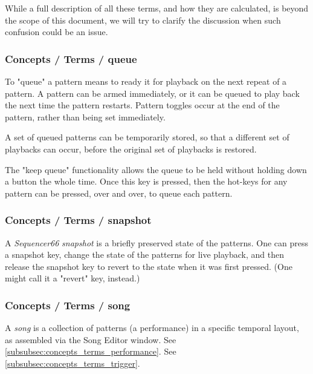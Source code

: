    While a full description of all these terms, and how they are calculated, is
   beyond the scope of this document, we will try to clarify the discussion
   when such confusion could be an issue.

\subsubsection{Concepts / Terms / queue}
\label{subsubsec:concepts_terms_queue_mode}

   To "queue" a pattern means to ready it for playback on the next repeat of
   a pattern.  A pattern can be armed immediately, or it can be queued to
   play back the next time the pattern restarts.
   Pattern toggles occur at the end of
   the pattern, rather than being set immediately.

   A set of queued patterns can be temporarily stored, so that a different
   set of playbacks can occur, before the original set of playbacks is
   restored.

   The "keep queue" functionality allows the queue to be held without
   holding down a button the whole time.  Once this key is pressed,
   then the hot-keys for any pattern can be pressed, over and over,
   to queue each pattern.

\subsubsection{Concepts / Terms / snapshot}
\label{subsubsec:concepts_terms_snapshot}

   A \textsl{Sequencer66} \textsl{snapshot} is a briefly preserved
   state of the patterns.  One can press a snapshot key, change the state of
   the patterns for live playback, and then release the snapshot key to
   revert to the state when it was first pressed.  (One might call it a
   "revert" key, instead.)

\subsubsection{Concepts / Terms / song}
\label{subsubsec:concepts_terms_song}

   A \textsl{song} is a collection of patterns (a performance)
   in a specific temporal layout, as assembled via the Song Editor window.
   See \ref{subsubsec:concepts_terms_performance}.
   See \ref{subsubsec:concepts_terms_trigger}.

